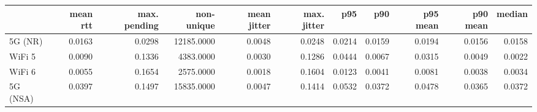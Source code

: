 \begin{tabular}{l|rrrrrrrrrr}
\rowcolor{gray!50}
 & mean rtt & max. pending & non-unique & mean jitter & max. jitter & p95 & p90 & p95 mean & p90 mean & median\\\hline
5G (NR) & 0.0163 & 0.0298 & 12185.0000 & 0.0048 & 0.0248 & 0.0214 & 0.0159 & 0.0194 & 0.0156 & 0.0158 \\
WiFi 5 & 0.0090 & 0.1336 & 4383.0000 & 0.0030 & 0.1286 & 0.0444 & 0.0067 & 0.0315 & 0.0049 & 0.0022 \\
WiFi 6 & 0.0055 & 0.1654 & 2575.0000 & 0.0018 & 0.1604 & 0.0123 & 0.0041 & 0.0081 & 0.0038 & 0.0034 \\
5G (NSA) & 0.0397 & 0.1497 & 15835.0000 & 0.0047 & 0.1414 & 0.0532 & 0.0372 & 0.0478 & 0.0365 & 0.0372 \\
\end{tabular}
